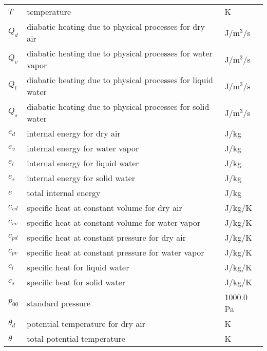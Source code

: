 \begin{table}[htbp]
\begin{tabular}{lll}
    $T$   & temperature                                          & K \\
    $Q_d$   & diabatic heating due to physical processes for dry air  & J/m$^3$/s \\
    $Q_v$   & diabatic heating due to physical processes for water vapor  & J/m$^3$/s \\
    $Q_l$   & diabatic heating due to physical processes for liquid water  & J/m$^3$/s \\
    $Q_s$   & diabatic heating due to physical processes for solid water  & J/m$^3$/s \\
    $e_d$   & internal energy for dry air  & J/kg \\
    $e_v$   & internal energy for water vapor  & J/kg \\
    $e_l$   & internal energy for liquid water & J/kg \\
    $e_s$   & internal energy for solid water & J/kg \\
    $e$   & total internal energy & J/kg \\
    $c_{vd}$   & specific heat at constant volume for dry air & J/kg/K \\
    $c_{vv}$   & specific heat at constant volume for water vapor & J/kg/K \\
    $c_{pd}$   & specific heat at constant pressure for dry air & J/kg/K \\
    $c_{pv}$   & specific heat at constant pressure for water vapor & J/kg/K \\
    $c_l$   & specific heat for liquid water & J/kg/K \\
    $c_s$   & specific heat for solid water & J/kg/K \\
    $p_{00}$   & standard pressure & 1000.0 Pa \\
    $\theta_d $   & potential temperature for dry air&  K \\
    $\theta $   & total potential temperature&  K \\
    \hline
  \end{tabular}
\end{table}
